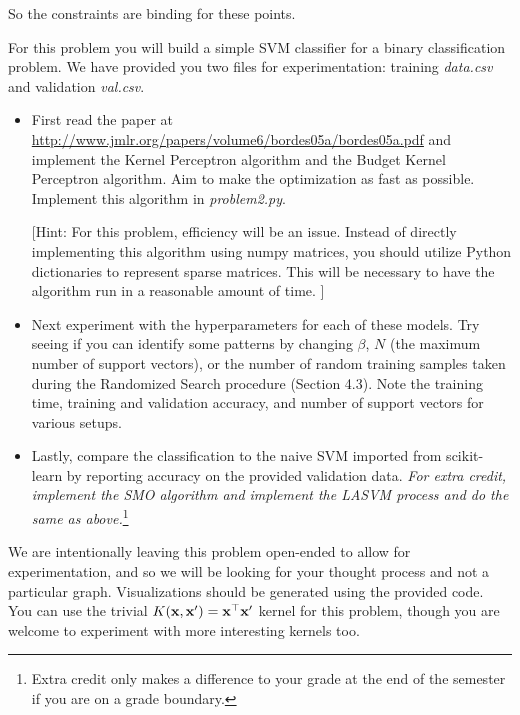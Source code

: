 \documentclass[submit]{harvardml}
\begin{document}
\begin{enumerate}
        So the constraints are binding for these points.
\end{enumerate}

\newpage

\begin{problem}


  For this problem you will build a simple SVM classifier for a binary
  classification problem. We have provided you two files for
  experimentation: training \textit{data.csv} and validation
  \textit{val.csv}.
\begin{itemize}
\item First read the paper at
  \url{http://www.jmlr.org/papers/volume6/bordes05a/bordes05a.pdf} and
  implement the Kernel Perceptron algorithm and the Budget Kernel
  Perceptron algorithm. Aim to make the optimization as fast as possible.
  Implement this algorithm in \textit{problem2.py}.

  [Hint: For this problem, efficiency will be an issue. Instead of directly
implementing this algorithm using numpy matrices, you should utilize
Python dictionaries to represent sparse matrices. This will be necessary
to have the algorithm run in a reasonable amount of time.
]
\item Next experiment with the hyperparameters for each of these
  models. Try seeing if you can identify some patterns by changing
  $\beta$, $N$ (the maximum number of support vectors), or the number
  of random training samples taken during the Randomized Search
  procedure (Section 4.3).  Note the training time, training and
  validation accuracy, and number of support vectors for various
  setups.
\item Lastly, compare the classification to the naive SVM imported from
scikit-learn by reporting accuracy on the provided validation
data. {\em For extra credit, implement the SMO algorithm and implement
  the LASVM process and do the same as above.}\footnote{Extra credit
  only makes a difference to your grade at the end of the semester if
  you are on a grade boundary.}

\end{itemize}


We are intentionally leaving this problem open-ended to allow for
experimentation, and so we will be looking for your thought process
and not a particular graph.  Visualizations should be generated
using the provided code. You can use the trivial
$K(\mathbf{x},\mathbf{x}') = \mathbf{x}^\top \mathbf{x}'$ kernel for this problem,
though you are welcome to experiment with more interesting kernels
too.



\end{problem}
\end{document}

